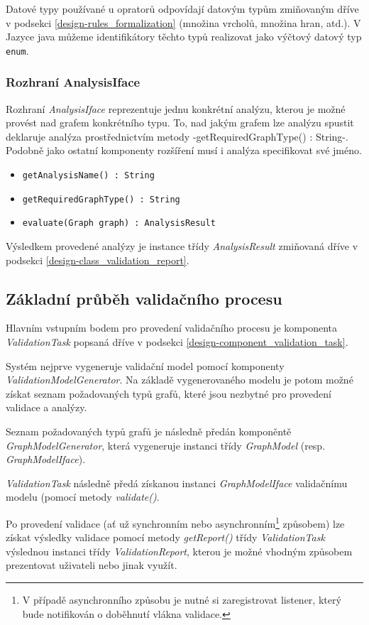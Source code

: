 Datové typy používané u opratorů odpovídají datovým typům zmiňovaným dříve v podsekci \ref{design-rules_formalization} (množina vrcholů, množina hran, atd.). V Jazyce java můžeme identifikátory těchto typů realizovat jako výčtový datový typ \verb-enum-.

\subsubsection{Rozhraní AnalysisIface}
Rozhraní \emph{AnalysisIface} reprezentuje jednu konkrétní analýzu, kterou je možné provést nad grafem konkrétního typu. To, nad jakým grafem lze analýzu spustit deklaruje analýza prostřednictvím metody -getRequiredGraphType() : String-. Podobně jako ostatní komponenty rozšíření musí i analýza specifikovat své jméno.

\begin{itemize}
\item \verb-getAnalysisName() : String-
\item \verb-getRequiredGraphType() : String-
\item \verb-evaluate(Graph graph) : AnalysisResult-
\end{itemize}

Výsledkem provedené analýzy je instance třídy \emph{AnalysisResult} zmiňovaná dříve v podsekci \ref{design-class_validation_report}.

\subsection{Základní průběh validačního procesu}
Hlavním vstupním bodem pro provedení validačního procesu je komponenta \emph{ValidationTask} popsaná dříve v podsekci \ref{design-component_validation_task}.

Systém nejprve vygeneruje validační model pomocí komponenty \emph{ValidationModelGenerator}. Na základě vygenerovaného modelu je potom možné získat seznam požadovaných typů grafů, které jsou nezbytné pro provedení validace a analýzy.

Seznam požadovaných typů grafů je následně předán komponěntě \emph{GraphModelGenerator}, která vygeneruje instanci třídy \emph{GraphModel} (resp. \emph{GraphModelIface}).

\emph{ValidationTask} následně předá získanou instanci \emph{GraphModelIface} validačnímu modelu (pomocí metody \emph{validate()}.

Po provedení validace (ať už synchronním nebo asynchronním\footnote{V případě asynchronního způsobu je nutné si zaregistrovat listener, který bude notifikován o doběhnutí vlákna validace.} způsobem) lze získat výsledky validace pomocí metody \emph{getReport()} třídy \emph{ValidationTask} výslednou instanci třídy \emph{ValidationReport}, kterou je možné vhodným způsobem prezentovat uživateli nebo jinak využít.

